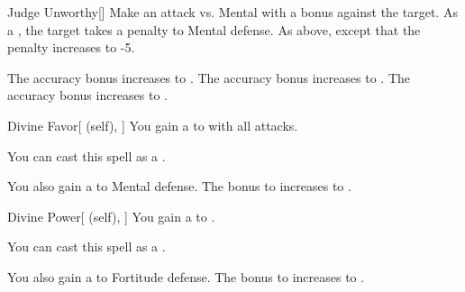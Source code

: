 \lowercase{\hypertarget{spell:Judge Unworthy}{}}\label{spell:Judge Unworthy}
\begin{freeability}[Rank 2]{\hypertarget{spell:Judge Unworthy}{Judge Unworthy}}[]
Make an attack vs. Mental with a  bonus against the target.
\hit As a , the target takes a  penalty to Mental defense.
\crit As above, except that the penalty increases to -5.

\rankline
{} The accuracy bonus increases to .
 The accuracy bonus increases to .
 The accuracy bonus increases to .

\end{freeability}
\vspace{0.25em}



\lowercase{\hypertarget{spell:Divine Favor}{}}\label{spell:Divine Favor}
\begin{attuneability}[Rank 3]{\hypertarget{spell:Divine Favor}{Divine Favor}}[ (self), ]
You gain a   to  with all attacks.

You can cast this spell as a .

\rankline
{} You also gain a   to Mental defense.
 The bonus to  increases to .

\end{attuneability}
\vspace{0.25em}



\lowercase{\hypertarget{spell:Divine Power}{}}\label{spell:Divine Power}
\begin{attuneability}[Rank 3]{\hypertarget{spell:Divine Power}{Divine Power}}[ (self), ]
You gain a   to .

You can cast this spell as a .

\rankline
{} You also gain a   to Fortitude defense.
 The bonus to  increases to .

\end{attuneability}
\vspace{0.25em}



